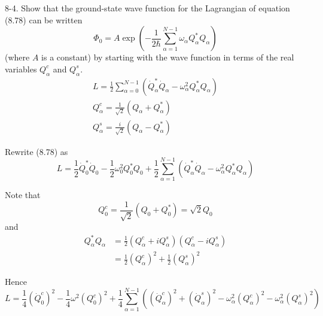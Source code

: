 \documentclass[12pt]{article}
\begin{document}
8-4.
Show that the ground-state wave function for the Lagrangian of
equation (8.78) can be written
\begin{equation*}
\Phi_0=A\exp\left(
-\frac{1}{2\hbar}
\sum_{\alpha=1}^{N-1}
\omega_\alpha Q_\alpha^*Q_\alpha
\right)
\tag{8.83}
\end{equation*}
(where $A$ is a constant) by starting with the wave function in terms of
the real variables $Q_\alpha^c$ and $Q_\alpha^s$.
\begin{gather*}
L=\frac{1}{2}\sum_{\alpha=0}^{N-1}
\left(\dot Q_\alpha^*\dot Q_\alpha-\omega_\alpha^2Q_\alpha^*Q_\alpha\right)
\tag{8.78}
\\
Q_\alpha^c=\frac{1}{\sqrt2}(Q_\alpha+Q_\alpha^*)
\tag{8.79}
\\
Q_\alpha^s=\frac{i}{\sqrt2}(Q_\alpha-Q_\alpha^*)
\tag{8.80}
\end{gather*}

Rewrite (8.78) as
\begin{equation*}
L=\frac{1}{2}\dot Q_0^*\dot Q_0
-\frac{1}{2}\omega_0^2Q_0^*Q_0
+\frac{1}{2}\sum_{\alpha=1}^{N-1}
\left(\dot Q_\alpha^*\dot Q_\alpha-\omega_\alpha^2Q_\alpha^*Q_\alpha\right)
\end{equation*}

Note that
\begin{equation*}
Q_0^c=\frac{1}{\sqrt2}(Q_0+Q_0^*)=\sqrt2Q_0
\end{equation*}
and
\begin{align*}
Q_\alpha^*Q_\alpha
&=\frac{1}{2}(Q_\alpha^c+iQ_\alpha^s)(Q_\alpha^c-iQ_\alpha^s)
\\
&=\frac{1}{2}(Q_\alpha^c)^2+\frac{1}{2}(Q_\alpha^s)^2
\end{align*}

Hence
\begin{equation*}
L=\frac{1}{4}(\dot Q_0^c)^2-\frac{1}{4}\omega^2(Q_0^c)^2
+\frac{1}{4}\sum_{\alpha=1}^{N-1}
\left(
(\dot Q_\alpha^c)^2
+(\dot Q_\alpha^s)^2
-\omega_\alpha^2(Q_\alpha^c)^2
-\omega_\alpha^2(Q_\alpha^s)^2
\right)
\end{equation*}

\end{document}

